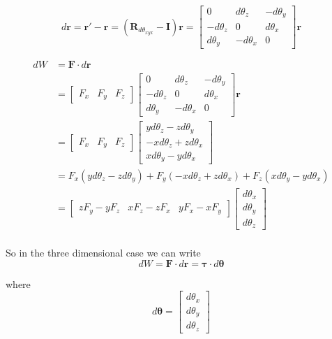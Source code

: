 \documentclass{article}      %
\newcommand{\Br}[0]{\mathbf{r}}
\newcommand{\BF}[0]{\mathbf{F}}
\newcommand{\BI}[0]{\mathbf{I}}
\newcommand{\BR}[0]{\mathbf{R}}
\newcommand{\Btheta}[0]{\boldsymbol{\theta}}
\newcommand{\Btau}[0]{\boldsymbol{\tau}}
\begin{document}
\begin{equation*}
d\Br = \Br' - \Br =
(\BR_{d\theta_{xyx}}-\BI) \Br
=
\begin{bmatrix}
0 & d\theta_z & -d\theta_y \\
-d\theta_z & 0 & d\theta_x \\
d\theta_y & -d\theta_x & 0
\end{bmatrix} \Br
\end{equation*}

\begin{align*}
dW &= \BF \cdot d\Br \\
   &=
\begin{bmatrix}
F_x & F_y & F_z
\end{bmatrix}
\begin{bmatrix}
0 & d\theta_z & -d\theta_y \\
-d\theta_z & 0 & d\theta_x \\
d\theta_y & -d\theta_x & 0
\end{bmatrix} \Br \\
 &=
\begin{bmatrix}
F_x & F_y & F_z
\end{bmatrix}
\begin{bmatrix}
    y d\theta_z - z d\theta_y \\
- x d\theta_z + z d\theta_x \\
x d\theta_y - y d\theta_x
\end{bmatrix} \\
  &=
F_x(y d\theta_z - z d\theta_y) +
F_y(- x d\theta_z + z d\theta_x) +
F_z(x d\theta_y - y d\theta_x) \\
  &=
\begin{bmatrix}
z F_y - y F_z & x F_z - z F_x & y F_x - x F_y
\end{bmatrix}
\begin{bmatrix}
d\theta_x \\
d\theta_y \\
d\theta_z
\end{bmatrix} \\
\end{align*}

So in the three dimensional case
we can write
\begin{equation*}
dW = \BF \cdot d\Br = \Btau \cdot d\Btheta
\end{equation*}

where
\begin{equation*}
d\Btheta =
\begin{bmatrix}
d\theta_x \\
d\theta_y \\
d\theta_z
\end{bmatrix}
\end{equation*}
\end{document}
